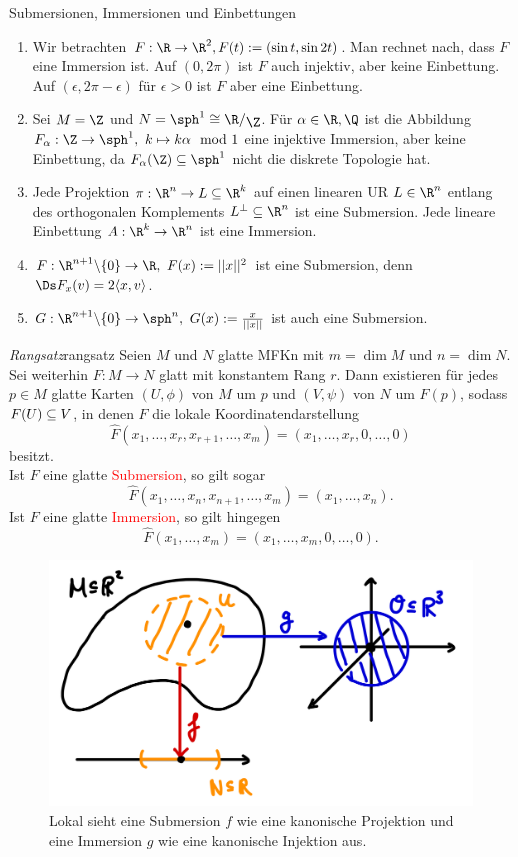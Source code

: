 \begin{beispiele} Submersionen, Immersionen und Einbettungen\\
\begin{enumerate}
\item Wir betrachten $F: \R \to \R^2, F(t):=(\sin t, \sin 2t)$. Man rechnet nach, dass $F$ eine Immersion ist. Auf $(0, 2\pi)$ ist $F$ auch injektiv, aber keine Einbettung. Auf $(\epsilon, 2\pi - \epsilon)$ für $\epsilon > 0$ ist $F$ aber eine Einbettung.
\item Sei $M=\Z$ und $N= \sph^1 \cong \quotient{\R}{\Z}$. Für $\alpha \in \R, \Q$ ist die Abbildung $F_\alpha: \Z \to \sph^1, \ k \mapsto k \alpha \mod 1$ eine injektive Immersion, aber keine Einbettung, da $F_\alpha(\Z) \sub \sph^1$ nicht die diskrete Topologie hat.
\item Jede Projektion $\pi: \R^n \to L \sub \R^k$ auf einen linearen UR $L \in \R^n$ entlang des orthogonalen Komplements $L^\perp \sub \R^n$ ist eine Submersion. Jede lineare Einbettung $A: \R^k \to \R^n$ ist eine Immersion.
\item $F: \R^{n+1} \exc \{0\}  \to \R, \ F(x) := ||x||^2$ ist eine Submersion, denn $\Ds F_x(v) = 2 \ip{x,v}$.
\item $G:  \R^{n+1} \exc \{0\} \to \sph^n, \ G(x):=\frac{x}{||x||}$ ist auch eine Submersion.
\end{enumerate}
\end{beispiele}
\begin{satz}{\textit{Rangsatz}}{rangsatz}
Seien $M$ und $N$ glatte MFKn mit $m = \dim M$ und $n = \dim N$. Sei weiterhin $F: M \to N$ glatt mit konstantem Rang $r$. Dann existieren für jedes $p \in M$ glatte Karten $(U,\phi)$ von $M$ um $p$ und $(V,\psi)$ von $N$ um $F(p)$, sodass $F(U) \subseteq V$, in denen $F$ die lokale Koordinatendarstellung 
\begin{equation}
\hat{F} (x_1, \dots, x_r, x_{r+1}, \dots, x_m) = (x_1, \dots, x_r, 0, \dots, 0)
\end{equation}
besitzt.\\
Ist $F$ eine glatte \textcolor{red}{Submersion}, so gilt sogar
\begin{equation}
\hat{F} (x_1, \dots, x_n, x_{n+1}, \dots, x_m) = (x_1, \dots, x_n).
\end{equation}
Ist $F$ eine glatte \textcolor{red}{Immersion}, so gilt hingegen
\begin{equation}
\hat{F} (x_1, \dots, x_m) = (x_1, \dots, x_m, 0, \dots, 0).
\end{equation}
\begin{figure}[H]
\label{fig:submersionimmersion}
\centering
\includegraphics[width=0.3\linewidth]{Bilder/submerimmer.png}
\caption{Lokal sieht eine Submersion $f$ wie eine kanonische Projektion und eine Immersion $g$ wie eine kanonische Injektion aus.}
\end{figure}
\end{satz}
